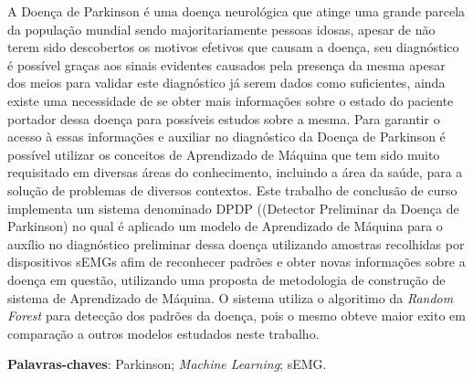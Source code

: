 \begin{resumo}
    A Doença de Parkinson é uma doença neurológica que atinge uma grande parcela da população mundial sendo majoritariamente pessoas idosas, apesar de não terem sido descobertos os motivos efetivos que causam a doença, seu diagnóstico é possível graças aos sinais evidentes causados pela presença da mesma apesar dos meios para validar este diagnóstico já serem dados como suficientes, ainda existe uma necessidade de se obter mais informações sobre o estado do paciente portador dessa doença para possíveis estudos sobre a mesma. Para garantir o acesso à essas informações e auxiliar no diagnóstico da Doença de Parkinson é possível utilizar os conceitos de Aprendizado de Máquina que tem sido muito requisitado em diversas áreas do conhecimento, incluindo a área da saúde, para a solução de problemas de diversos contextos. Este trabalho de conclusão de curso implementa um sistema denominado DPDP ((Detector Preliminar da Doença de Parkinson) no qual é aplicado um modelo de Aprendizado de Máquina para o auxílio no diagnóstico preliminar dessa doença utilizando amostras recolhidas por dispositivos sEMGs afim de reconhecer padrões e obter novas informações sobre a doença em questão, utilizando uma proposta de metodologia de construção de sistema de Aprendizado de Máquina. O sistema utiliza o algoritimo da \textit{Random Forest} para detecção dos padrões da doença, pois o mesmo obteve maior exito em comparação a outros modelos estudados neste trabalho.

 \vspace{\onelineskip}
    
 \noindent
 \textbf{Palavras-chaves}: Parkinson; \textit{Machine Learning}; sEMG.
\end{resumo}
